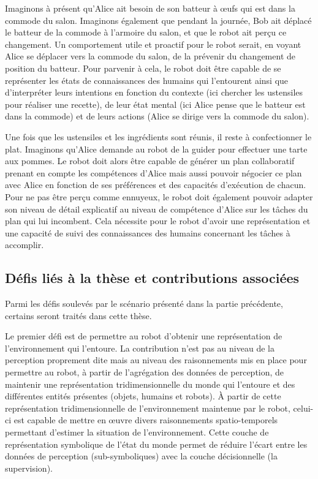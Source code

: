 \documentclass[a4paper,11pt,twoside]{StyleThese}
\begin{document}
Imaginons à présent qu'Alice ait besoin de son batteur à œufs qui est dans la commode du salon. Imaginons également que pendant la journée, Bob ait déplacé le batteur de la commode à l'armoire du salon, et que le robot ait perçu ce changement.
Un comportement utile et proactif pour le robot serait, en voyant Alice se déplacer vers la commode du salon, de la prévenir du changement de position du batteur.
Pour parvenir à cela, le robot doit être capable de se représenter les états de connaissances des humains qui l'entourent ainsi que d'interpréter leurs intentions en fonction du contexte (ici chercher les ustensiles pour réaliser une recette), de leur état mental (ici Alice pense que le batteur est dans la commode) et de leurs actions (Alice se dirige vers la commode du salon).

Une fois que les ustensiles et les ingrédients sont réunis, il reste à confectionner le plat. Imaginons qu'Alice demande au robot de la guider pour effectuer une tarte aux pommes. Le robot doit alors être capable de générer un plan collaboratif prenant en compte les compétences d'Alice mais aussi pouvoir négocier ce plan avec Alice en fonction de ses préférences et des capacités d'exécution de chacun.
Pour ne pas être perçu comme ennuyeux, le robot doit également pouvoir adapter son niveau de détail explicatif au niveau de compétence d'Alice sur les tâches du plan qui lui incombent.
Cela nécessite pour le robot d'avoir une représentation et une capacité de suivi des connaissances des humains concernant les tâches à accomplir.




\subsection{Défis liés à la thèse et contributions associées}
Parmi les défis soulevés par le scénario présenté dans la partie précédente, certains seront traités dans cette thèse.

Le premier défi est de permettre au robot d'obtenir une représentation de l'environnement qui l'entoure. La contribution n'est pas au niveau de la perception proprement dite mais au niveau des raisonnements mis en place pour permettre au robot, à partir de l'agrégation des données de perception, de maintenir une représentation tridimensionnelle du monde qui l'entoure et des différentes entités présentes (objets, humains et robots). À partir de cette représentation tridimensionnelle de l'environnement maintenue par le robot, celui-ci est capable  de mettre en œuvre divers raisonnements spatio-temporels permettant d'estimer la situation de l'environnement. Cette couche de représentation symbolique de l'état du monde permet de réduire l'écart entre les données de perception (sub-symboliques) avec la couche décisionnelle (la supervision).
\end{document}
